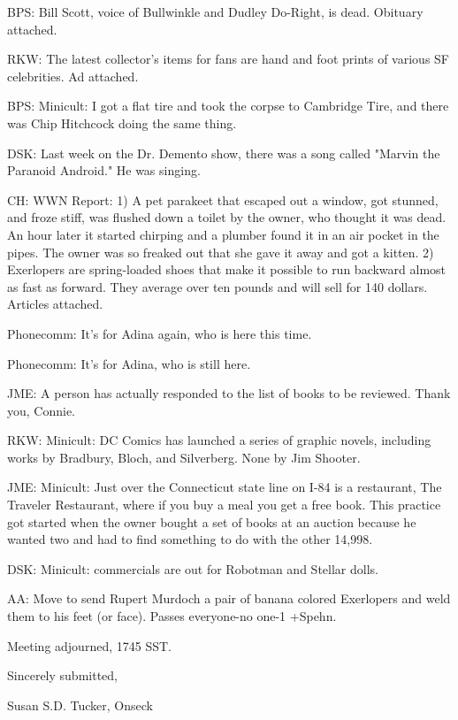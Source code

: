 \documentclass[12pt]{article}
\begin{document}
BPS: Bill Scott, voice of Bullwinkle and Dudley Do-Right, is dead. Obituary attached.

RKW: The latest collector's items for fans are hand and foot prints of various SF celebrities. Ad attached.

BPS: Minicult: I got a flat tire and took the corpse to Cambridge Tire, and there was Chip Hitchcock doing the same thing.

DSK: Last week on the Dr. Demento show, there was a song called "Marvin the Paranoid Android." He was singing.

CH: WWN Report: 1) A pet parakeet that escaped out a window, got stunned, and froze stiff, was flushed down a toilet by the owner, who thought it was dead. An hour later it started chirping and a plumber found it in an air pocket in the pipes. The owner was so freaked out that she gave it away and got a kitten. 2) Exerlopers are spring-loaded shoes that make it possible to run backward almost as fast as forward. They average over ten pounds and will sell for 140 dollars. Articles attached.

Phonecomm: It's for Adina again, who is here this time.

Phonecomm: It's for Adina, who is still here.

JME: A person has actually responded to the list of books to be reviewed. Thank you, Connie.

RKW: Minicult: DC Comics has launched a series of graphic novels, including works by Bradbury, Bloch, and Silverberg. None by Jim Shooter.

JME: Minicult: Just over the Connecticut state line on I-84 is a restaurant, The Traveler Restaurant, where if you buy a meal you get a free book. This practice got started when the owner bought a set of books at an auction because he wanted two and had to find something to do with the other 14,998.

DSK: Minicult: commercials are out for Robotman and Stellar dolls.

AA: Move to send Rupert Murdoch a pair of banana colored Exerlopers and weld them to his feet (or face). Passes everyone-no one-1 +Spehn.

\vspace{12pt}

\noindent
Meeting adjourned, 1745 SST.

\vspace{18pt}

\centerline{Sincerely submitted,}
\centerline{Susan S.D. Tucker, Onseck}
\end{document}
